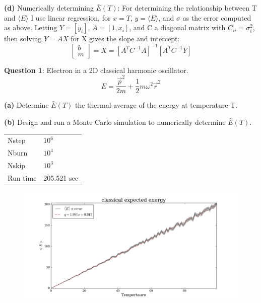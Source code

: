 \documentclass{article}
\begin{document}
\textbf{(d)} Numerically determining $\bar{E}(T)$: For determining the relationship between T and $\langle E\rangle$ I use linear regression, for $x=T$, $y=\langle E\rangle$, and $\sigma$ as the error computed as above. Letting $Y = [y_i]$, $A = [1, x_i]$, and C a diagonal matrix with $C_{ii} = \sigma_{i}^{2}$, then solving $Y = AX$ for X gives the slope and intercept:
	\[\begin{bmatrix} b \\ m \end{bmatrix} = X = [A^T C^{-1} A]^{-1} [A^{T} C^{-1} Y] \]

\bigskip
\textbf{Question 1}: Electron in a 2D classical harmonic oscillator. 
	\[E = \frac{\vec{p}^2}{2m} + \frac{1}{2}m\omega^2 \vec{r}^2 \]

\textbf{(a)} Determine $\bar{E}(T)$ the thermal average of the energy at temperature T.


\textbf{(b)} Design and run a Monte Carlo simulation to numerically determine $\bar{E}(T)$. 

\begin{table}[H]
\centering
\begin{tabular}{|l|l|}
	\hline
	Nstep    & $10^6$ \\
	Nburn    & $10^4$ \\
	Nskip    & $10^3$ \\
	Run time & 205.521 sec \\
	\hline
\end{tabular}
\end{table}

\begin{figure}[H]
\begin{center}
\includegraphics[width=16cm]{../output/classical/expected.png} 
\end{center}
\end{figure}
\end{document}

